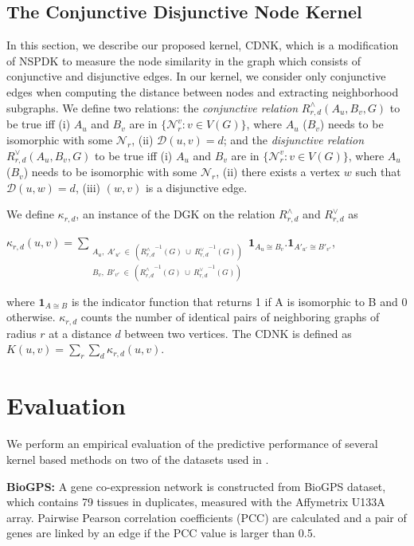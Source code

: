 \documentclass{esannV2}
\begin{document}
\subsection{The Conjunctive Disjunctive Node Kernel}
In this section, we describe our proposed kernel, CDNK, which is a modification of NSPDK to measure the node similarity in the graph which consists of conjunctive and disjunctive edges. In our kernel, we consider only conjunctive edges when computing the distance between nodes and extracting neighborhood subgraphs. We define two relations: the \textit{conjunctive relation} $R^{\wedge}_{r,d}(A_u, B_v, G)$ to be true iff (i) $A_u$ and $B_v$ are in $\lbrace \mathcal{N}_r^v: v \in V(G) \rbrace$, where $A_u$ ($B_v$) needs to be isomorphic with some $\mathcal{N}_r$, (ii) $\mathcal{D}(u,v)= d$; and the \textit{disjunctive relation} $R_{r,d}^{\vee}(A_u, B_v, G)$ to be true iff (i) $A_u$ and $B_v$ are in $\lbrace \mathcal{N}_r^v: v \in V(G) \rbrace$, where $A_u$ ($B_v$) needs to be isomorphic with some $\mathcal{N}_r$,  (ii) there exists a vertex $w$ such that $\mathcal{D}(u,w)= d$, (iii) $(w,v)$ is a disjunctive edge.

We define $\kappa_{r,d}$, an instance of the DGK on the relation $R^{\wedge}_{r,d}$ and $R^{\vee}_{r,d}$ as
\begin{center}
 $\kappa_{r,d}(u,v) = \sum\limits_{\substack
 {A_u,\ {A'}_{u'} \ \in \ ({R_{r,d}^{\wedge}}^{ -1}(G)\ \cup\  {R_{r,d}^{\vee}}^{ -1}(G)) \\
  B_v,\ {B'}_{v'} \ \in \ ({R_{r,d}^{\wedge}}^{ -1}(G)\ \cup\  {R_{r,d}^{\vee}}^{ -1}(G)) }}
  { \textbf{1}_{A_u \cong B_v}.{ \textbf{1}_{A'_{u'} \cong B'_{v'}}}}$,
\end{center}
where $\textbf{1}_{A \cong B}$ is the indicator function that returns 1 if A is isomorphic to B and 0 otherwise.
$\kappa_{r,d}$ counts the number of identical pairs of neighboring graphs of radius $r$ at a distance $d$ between two vertices. The CDNK is defined as $K(u,v) = \sum\limits_{r}{\sum\limits_{d}{\kappa_{r,d}(u,v)}}$.

\section{Evaluation}
\label{evaluation}
We perform an empirical evaluation of the predictive performance of several kernel based methods on two of the datasets used in \cite{medk}.

\textbf{BioGPS:} A gene co-expression network is constructed from BioGPS dataset, which contains 79 tissues in duplicates, measured with the Affymetrix U133A array. Pairwise Pearson correlation coefficients (PCC) are calculated and a pair of genes are linked by an edge if the PCC value is larger than 0.5.
\end{document}
